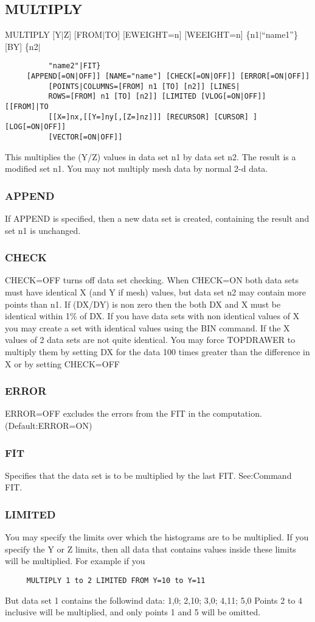 \subsection{MULTIPLY}
MULTIPLY [Y$|$Z] [FROM$|$TO] [EWEIGHT=n] [WEEIGHT=n] \{n1$|$``name1''\} [BY] \{n2$|$
\begin{verbatim}
          "name2"|FIT} 
     [APPEND[=ON|OFF]] [NAME="name"] [CHECK[=ON|OFF]] [ERROR[=ON|OFF]]
          [POINTS|COLUMNS=[FROM] n1 [TO] [n2]] [LINES|
          ROWS=[FROM] n1 [TO] [n2]] [LIMITED [VLOG[=ON|OFF]] [[FROM]|TO
          [[X=]nx,[[Y=]ny[,[Z=]nz]]] [RECURSOR] [CURSOR] ] [LOG[=ON|OFF]]
          [VECTOR[=ON|OFF]] 
\end{verbatim}
This  multiplies  the  (Y/Z)  values  in data set n1 by data set n2.  The
result is a modified set n1.  You may not multiply mesh  data  by  normal
2-d data.  
\subsubsection{APPEND}
If  APPEND is specified, then a new data set is created, containing the
result and set n1 is unchanged.  
\subsubsection{CHECK}
CHECK=OFF  turns  off  data set checking.  When CHECK=ON both data sets
must have identical X (and Y if mesh)  values,  but  data  set  n2  may
contain  more  points than n1.  If (DX/DY) is non zero then the both DX
and X must be identical within 1\% of DX.  If you have  data  sets  with
non  identical  values  of X you may create a set with identical values
using the BIN command.  If the X values of 2 data sets  are  not  quite
identical.   You may force TOPDRAWER to multiply them by setting DX for
the data 100 times greater than the  difference  in  X  or  by  setting
CHECK=OFF 
\subsubsection{ERROR}
ERROR=OFF excludes the errors from the FIT in the computation.  
(Default:ERROR=ON) 
\subsubsection{FIT}
Specifies  that  the  data  set  is  to  be multiplied by the last FIT.
See:Command FIT.  
\subsubsection{LIMITED}
You  may  specify  the  limits  over  which  the  histograms  are to be
multiplied.  If you specify the Y or  Z  limits,  then  all  data  that
contains values inside these limits will be multiplied.  For example if
you 
\begin{verbatim}
     MULTIPLY 1 to 2 LIMITED FROM Y=10 to Y=11 
\end{verbatim}
But data set 1 contains the followind data:  
1,0;  2,10;  3,0;  4,11;  5,0 
Points  2  to  4  inclusive will be multiplied, and only points 1 and 5
will be omitted.  
